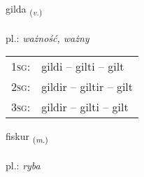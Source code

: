 \documentclass[frontgrid, backgrid]{flacards}\usepackage[]{graphicx}\usepackage[]{xcolor}
\begin{document}
\renewcommand{\flhead}{\vskip5pt \fboxsep=0pt {\small\bfseries\footnotesize Sagnorð | czasownik}}
\renewcommand{\fcfoot}{\vskip5pt \fboxsep=0pt \hspace{2pt}{\small\bfseries\footnotesize 1K}}

\renewcommand{\blhead}{\vskip5pt {\small\bfseries\footnotesize Sagnorð | czasownik }}
\renewcommand{\bcfoot}{\vskip5pt \hspace{2pt}{\small\bfseries\footnotesize 1K}}


{gilda \small{\textsubscript{(\textit{v.})}} \\[1ex] %
\textphonetic{[cɪlta]} \\
pl.: \emph{ważność, ważny} \\  [2ex]
\renewcommand*{\arraystretch}{0.8}
\begin{tabular}{p{1cm}l}
\textsc{1sg}: & gildi -- gilti -- gilt \\ 
\textsc{2sg}: & gildir -- giltir -- gilt \\ 
\textsc{3sg}: & gildir -- gilti -- gilt \\ 
\end{tabular}
}

\renewcommand{\flhead}{\vskip5pt \fboxsep=0pt {\small\bfseries\footnotesize Nafnorð | rzeczownik}}
\renewcommand{\fcfoot}{\vskip5pt \fboxsep=0pt \hspace{2pt}{\small\bfseries\footnotesize 1K}}

\renewcommand{\blhead}{\vskip5pt {\small\bfseries\footnotesize Nafnorð | rzeczownik }}
\renewcommand{\bcfoot}{\vskip5pt \hspace{2pt}{\small\bfseries\footnotesize 1K}}


{fiskur \small{\textsubscript{(\textit{m.})}} \\[1ex] %
\textphonetic{[fɪskʏr]} \\
pl.: \emph{ryba} \\  [2ex]
\renewcommand*{\arraystretch}{0.8}
}
\end{document}
